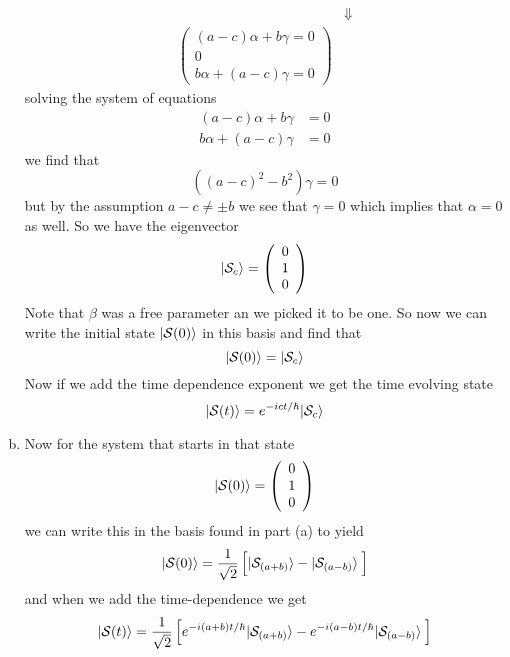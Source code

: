 \documentclass[11pt]{article}
\numberwithin{equation}{section}
\begin{document}
\begin{enumerate}[(a)]
\begin{align*}
&\Downarrow\\
\left(\begin{array}{c}(a-c)\alpha+b\gamma=0\\ 
                      0 \\ 
                      b\alpha+(a-c)\gamma=0\end{array}\right)&
\end{align*}
solving the system of equations 
\begin{align*}
(a-c)\alpha+b\gamma &= 0\\ 
 b\alpha+(a-c)\gamma &= 0
\end{align*}
we find that
$$\left((a-c)^2-b^2\right)\gamma = 0$$
but by the assumption $a-c\ne\pm b$ we see that $\gamma = 0$ which implies that $\alpha = 0$ as well. So we have the eigenvector
$$|{\mathcal{S}_{c}}\rangle = \left(\begin{array}{c}
                                     0\\ 1\\ 0
                              \end{array}\right)$$
Note that $\beta$ was a free parameter an we picked it to be one. So now we can write the initial state $|{\mathcal{S}(0)}\rangle$ in this basis and find that
$$|{\mathcal{S}(0)}\rangle = |{\mathcal{S}_c}\rangle$$
Now if we add the time dependence exponent we get the time evolving state
$$|{\mathcal{S}(t)}\rangle = e^{-ict/\hbar}|{\mathcal{S}_c}\rangle$$

\item
Now for the system that starts in that state
$$|{\mathcal{S}(0)}\rangle = \left(\begin{array}{c}
               0    \\
               1    \\
               0    
\end{array}\right)$$
we can write this in the basis found in part (a) to yield
$$|{\mathcal{S}(0)}\rangle = \frac{1}{\sqrt{2}}\left[|{\mathcal{S}_{(a+b)}}\rangle - |{\mathcal{S}_{(a-b)}}\rangle\frac{}{}\right]$$
and when we add the time-dependence we get
$$|{\mathcal{S}(t)}\rangle = \frac{1}{\sqrt{2}}\left[e^{-i(a+b)t/\hbar}|{\mathcal{S}_{(a+b)}}\rangle - e^{-i(a-b)t/\hbar}|{\mathcal{S}_{(a-b)}}\rangle\frac{}{}\right]$$

\end{enumerate}
\end{document}
